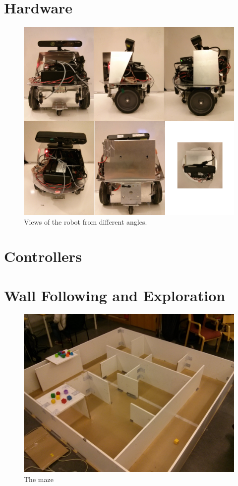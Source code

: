 \documentclass[10pt,a4paper]{article}
\begin{document}
\section{Hardware}
\begin{figure}
  \centering
  \includegraphics[width=\linewidth]{images/robo_views.png}
  \caption{Views of the robot from different angles.}
  \label{fig:roboview}
\end{figure}
\section{Controllers}
\section{Wall Following and Exploration}
\begin{figure}
  \centering
  \includegraphics[width=\linewidth]{images/maze.jpg}
  \caption{The maze}
  \label{fig:maze}
\end{figure}
\end{document}
